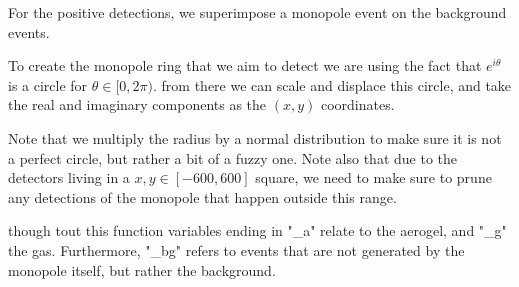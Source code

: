\documentclass[10pt, a4paper]{article}
\begin{document}
For the positive detections, we superimpose a monopole event on the background events.

To create the monopole ring that we aim to detect we are using the fact that $e^{i\theta}$ is a circle for $\theta \in [0, 2\pi)$. from there we can scale and displace this circle, and take the real and imaginary components as the $(x,y)$ coordinates.

Note that we multiply the radius by a normal distribution to make sure it is not a perfect circle, but rather a bit of a fuzzy one.
Note also that due to the detectors living in a $x, y \in [-600, 600]$ square, we need to make sure to prune any detections of the monopole that happen outside this range.

though tout this function variables ending in "_a" relate to the aerogel, and "_g" the gas. Furthermore, "_bg" refers to events that are not generated by the monopole itself, but rather the background.  
\end{document}
